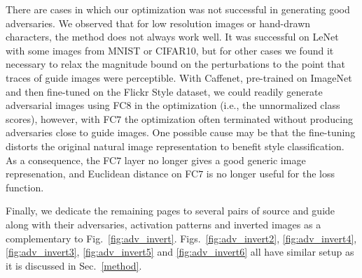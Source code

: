 \documentclass{article} %
\begin{document}
There are cases in which our optimization was not successful in generating good
adversaries.  We observed that for low resolution images or hand-drawn
characters, the method does not always work well.  It was successful on LeNet
with some images from MNIST or CIFAR10, but for other cases we found it
necessary to relax the magnitude bound on the perturbations to the point that
traces of guide images were perceptible. With Caffenet, pre-trained on ImageNet
and then fine-tuned on the Flickr Style dataset, we could readily generate
adversarial images using FC$8$ in the optimization (i.e., the unnormalized
class scores), however, with FC$7$ the optimization often terminated without
producing adversaries close to guide images.  One possible cause may be that
the fine-tuning distorts the original natural image representation to benefit
style classification. As a consequence, the FC$7$ layer no longer gives a good
generic image represenation, and Euclidean distance on FC$7$ is no longer
useful for the loss function.

Finally, we dedicate the remaining pages to several pairs of source and guide
along with their adversaries, activation patterns and inverted images as a
complementary to Fig.~\ref{fig:adv_invert}. Figs.~\ref{fig:adv_invert2},
\ref{fig:adv_invert4}, \ref{fig:adv_invert3}, \ref{fig:adv_invert5} and \ref{fig:adv_invert6}
all have similar setup as it is discussed in Sec.~\ref{method}.
\end{document}
